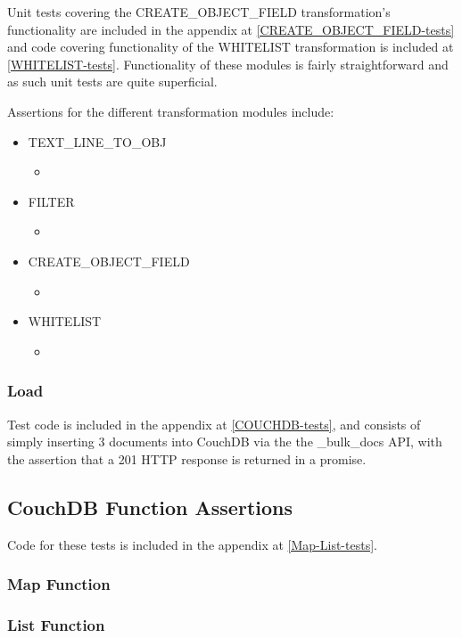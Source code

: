 Unit tests covering the CREATE\_OBJECT\_FIELD transformation's functionality are included in the appendix at \ref{CREATE_OBJECT_FIELD-tests} and code covering functionality of the WHITELIST transformation is included at \ref{WHITELIST-tests}. Functionality of these modules is fairly straightforward and as such unit tests are quite superficial.

Assertions for the different transformation modules include:

\begin{itemize}
    \item TEXT\_LINE\_TO\_OBJ
          \begin{itemize}
              \item
          \end{itemize}
    \item FILTER
          \begin{itemize}
              \item
          \end{itemize}
    \item CREATE\_OBJECT\_FIELD
          \begin{itemize}
              \item
          \end{itemize}
    \item WHITELIST
          \begin{itemize}
              \item
          \end{itemize}
\end{itemize}

\subsubsection{Load}
Test code is included in the appendix at \ref{COUCHDB-tests}, and consists of simply inserting 3 documents into CouchDB via the the \_bulk\_docs API, with the assertion that a 201 HTTP response is returned in a promise.

\subsection{CouchDB Function Assertions}
Code for these tests is included in the appendix at \ref{Map-List-tests}.

\subsubsection{Map Function}

\subsubsection{List Function}